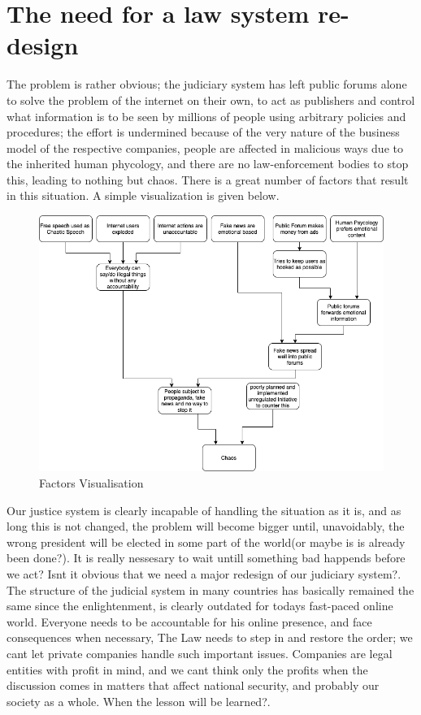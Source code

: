 \documentclass[openany]{article}
\begin{document}
	\section{The need for a law system re-design}
		The problem is rather obvious; the judiciary system has left public forums alone to solve the problem of the internet on their own, 
		to act as publishers and control what information is to be seen by millions of people using arbitrary policies and procedures; 
		the effort is undermined because of the very nature of the business model of the respective companies, people are affected in malicious 
		ways due to the inherited human phycology, and there are no law-enforcement bodies to stop this, leading to nothing but chaos\cite{murray}.
		There is a great number of factors that result in this situation. A simple visualization is given below.
	\begin{figure}[H]
		\iftrue
		\caption{Factors Visualisation}
		\centering
		\includegraphics[scale=0.3]{res/nutshell}
		\fi
	\end{figure}
		Our justice system is clearly incapable of handling the situation as it is, and as long this is not changed, the problem will become bigger 
		until, unavoidably, the wrong president will be elected in some part of the world(or maybe is is already been done?). It is really nessesary 
		to wait untill something bad happends before we act? Isnt it obvious that we need a major redesign of our judiciary system?. 
		The structure of the judicial system in many countries has basically remained the same since the enlightenment, is clearly outdated for todays 
		fast-paced online world. Everyone needs to be accountable for his online presence, and face consequences when necessary, The Law needs to step in and restore the order; 
		we cant let private companies handle such important issues. Companies are legal entities with profit in mind, and we cant think only the 
		profits when the discussion comes in matters that affect national security, and probably our society as a whole. When the lesson will be 
		learned?.
	
\end{document}
